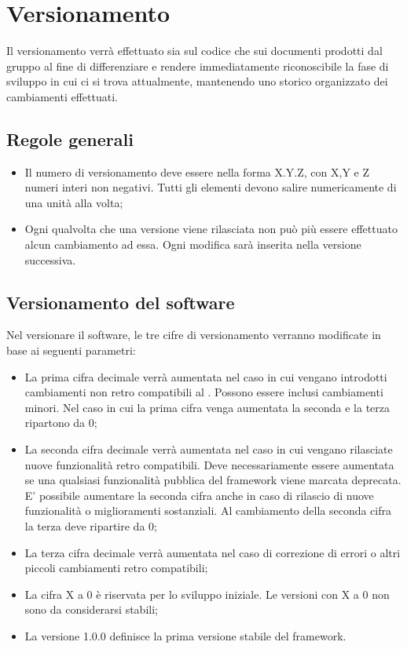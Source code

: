 \newpage
\section{Versionamento}
\label{6.0}
Il versionamento verrà effettuato sia sul codice che sui documenti prodotti dal gruppo al fine di differenziare e rendere immediatamente riconoscibile la fase di sviluppo in cui ci si trova attualmente, mantenendo uno storico organizzato dei cambiamenti effettuati.

\subsection{Regole generali}
\label{6.1}
\begin{itemize}
\item Il numero di versionamento deve essere nella forma X.Y.Z, con X,Y e Z numeri interi non negativi. Tutti gli elementi devono salire numericamente di una unità alla volta;
\item Ogni qualvolta che una versione viene rilasciata non può più essere effettuato alcun cambiamento ad essa. Ogni modifica sarà inserita nella versione successiva.
\end{itemize}

\subsection{Versionamento del software}
\label{6.2}
Nel versionare il software, le tre cifre di versionamento verranno modificate in base ai seguenti parametri:
\begin{itemize}
\item La prima cifra decimale verrà aumentata nel caso in cui vengano introdotti cambiamenti non retro compatibili al . Possono essere inclusi cambiamenti minori. Nel caso in cui la prima cifra venga aumentata la seconda e la terza ripartono da 0;
\item La seconda cifra decimale verrà aumentata nel caso in cui vengano rilasciate nuove funzionalità retro compatibili. Deve necessariamente essere aumentata se una qualsiasi funzionalità pubblica del framework viene marcata deprecata. E' possibile aumentare la seconda cifra anche in caso di rilascio di nuove funzionalità o miglioramenti sostanziali. Al cambiamento della seconda cifra la terza deve ripartire da 0;
\item La terza cifra decimale verrà aumentata nel caso di correzione di errori o altri piccoli cambiamenti retro compatibili;
\item La cifra X a 0 è riservata per lo sviluppo iniziale. Le versioni con X a 0 non sono da considerarsi stabili;
\item La versione 1.0.0 definisce la prima versione stabile del framework.
\end{itemize}

